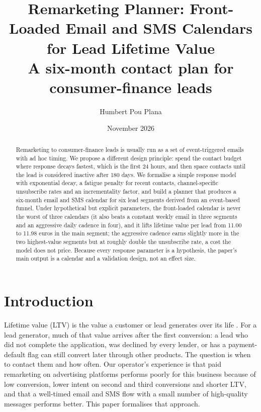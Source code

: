 \documentclass[10pt,a4paper]{article}
\begin{document}
\title{\bfseries Remarketing Planner: Front-Loaded Email and SMS Calendars for Lead Lifetime Value\\[2pt]\large A six-month contact plan for consumer-finance leads}
\author{Humbert Pou Plana}
\date{November 2026}
\maketitle
\begin{abstract}
Remarketing to consumer-finance leads is usually run as a set of event-triggered emails with ad hoc timing. We propose a different design principle: spend the contact budget where response decays fastest, which is the first 24 hours, and then space contacts until the lead is considered inactive after 180 days. We formalise a simple response model with exponential decay, a fatigue penalty for recent contacts, channel-specific unsubscribe rates and an incrementality factor, and build a planner that produces a six-month email and SMS calendar for six lead segments derived from an event-based funnel. Under hypothetical but explicit parameters, the front-loaded calendar is never the worst of three calendars (it also beats a constant weekly email in three segments and an aggressive daily cadence in four), and it lifts lifetime value per lead from 11.00 to 11.98 euros in the main segment; the aggressive cadence earns slightly more in the two highest-value segments but at roughly double the unsubscribe rate, a cost the model does not price. Because every response parameter is a hypothesis, the paper's main output is a calendar and a validation design, not an effect size.
\end{abstract}

\section{Introduction}
Lifetime value (LTV) is the value a customer or lead generates over its life \cite{gupta}. For a lead generator, much of that value arrives after the first conversion: a lead who did not complete the application, was declined by every lender, or has a payment-default flag can still convert later through other products. The question is when to contact them and how often. Our operator's experience is that paid remarketing on advertising platforms performs poorly for this business because of low conversion, lower intent on second and third conversions and shorter LTV, and that a well-timed email and SMS flow with a small number of high-quality messages performs better. This paper formalises that approach.
\end{document}
